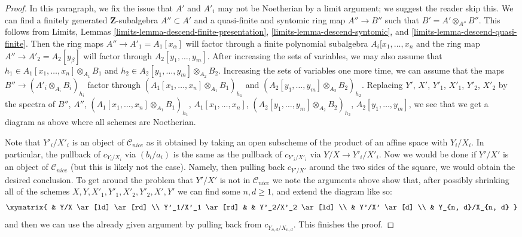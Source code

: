 \begin{proof}
\medskip\noindent
In this paragraph, we fix the issue that $A'$ and $A'_i$ may not be Noetherian
by a limit argument; we suggest the reader skip this.
We can find a finitely generated $\mathbf{Z}$-subalgebra
$A'' \subset A'$ and a quasi-finite and syntomic ring map
$A'' \to B''$ such that $B' = A' \otimes_{A''} B''$.
This follows from Limits, Lemmas
\ref{limits-lemma-descend-finite-presentation},
\ref{limits-lemma-descend-syntomic}, and
\ref{limits-lemma-descend-quasi-finite}.
Then the ring maps $A'' \to A'_1 = A_1[x_\alpha]$ will factor through a finite
polynomial subalgebra $A_i[x_1, \ldots, x_n$ and the ring map
$A'' \to A'_2 = A_2[y_\beta]$ will factor through $A_2[y_1, \ldots, y_m]$.
After increasing the sets of variables, we may also assume that
$h_1 \in A_1[x_1, \ldots, x_n] \otimes_{A_1} B_1$ and
$h_2 \in A_2[y_1, \ldots, y_m] \otimes_{A_2} B_2$.
Increasing the sets of variables one more time, we can assume
that the maps $B'' \to (A'_i \otimes_{A_i} B_i)_{h_i}$
factor through $(A_1[x_1, \ldots, x_n] \otimes_{A_1} B_1)_{h_1}$
and $(A_2[y_1, \ldots, y_m] \otimes_{A_2} B_2)_{h_2}$.
Replacing $Y'$, $X'$, $Y'_1$, $X'_1$, $Y'_2$, $X'_2$ by the spectra of
$B''$, $A''$, $(A_1[x_1, \ldots, x_n] \otimes_{A_1} B_1)_{h_1}$,
$A_1[x_1, \ldots, x_n]$, $(A_2[y_1, \ldots, y_m] \otimes_{A_2} B_2)_{h_2}$,
$A_2[y_1, \ldots, y_m]$, we see that we get a diagram as above
where all schemes are Noetherian.

\medskip\noindent
Note that $Y'_i/X'_i$ is an object of $\mathcal{C}_{nice}$ as it
obtained by taking an open subscheme of the product of an affine space
with $Y_i/X_i$. In particular, the pullback of
$c_{Y_i/X_i}$ via $(b_i/a_i)$ is the same as the pullback of
$c_{Y'_i/X'_i}$ via $Y/X \to Y'_i/X'_i$.
Now we would be done if $Y'/X'$ is an object of $\mathcal{C}_{nice}$
(but this is likely not the case). Namely, then pulling back $c_{Y'/X'}$
around the two sides of the square, we would obtain the desired conclusion.
To get around the problem that $Y'/X'$ is not in $\mathcal{C}_{nice}$
we note the arguments above show that, after possibly shrinking all
of the schemes $X, Y, X'_1, Y'_1, X'_2, Y'_2, X', Y'$ we can find some
$n, d \geq 1$, and extend the diagram like so:
$$
\xymatrix{
& Y/X \ar[ld] \ar[rd] \\
Y'_1/X'_1 \ar[rd] & & Y'_2/X'_2 \ar[ld] \\
& Y'/X' \ar[d] \\
& Y_{n, d}/X_{n, d}
}
$$
and then we can use the already given argument by pulling
back from $c_{Y_{n, d}/X_{n, d}}$. This finishes the proof.
\end{proof}













